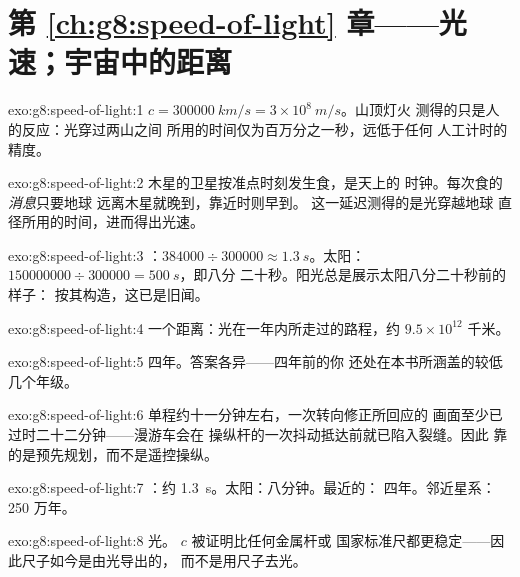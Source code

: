 \section*{第 \ref{ch:g8:speed-of-light} 章——光速；宇宙中的距离}

\begin{solution}{exo:g8:speed-of-light:1}
$c = \qty{300000}{km/s} = 3 \times 10^{8}\ \unit{m/s}$。山顶灯火
测得的只是人的反应：光穿过两山之间
所用的时间仅为百万分之一秒，远低于任何
人工计时的精度。
\end{solution}

\begin{solution}{exo:g8:speed-of-light:2}
木星的卫星按准点时刻发生食，是天上的
时钟。每次食的\emph{消息}只要地球
远离木星就晚到，靠近时则早到。
这一延迟测得的是光穿越地球
直径所用的时间，进而得出光速。
\end{solution}

\begin{solution}{exo:g8:speed-of-light:3}
：$384000 \div 300000 \approx \qty{1.3}{s}$。太阳：
$150000000 \div 300000 = \qty{500}{s}$，即八分
二十秒。阳光总是展示太阳八分二十秒前的样子：
按其构造，这已是旧闻。
\end{solution}

\begin{solution}{exo:g8:speed-of-light:4}
一个距离：光在一年内所走过的路程，约
$9.5 \times 10^{12}$ 千米。
\end{solution}

\begin{solution}{exo:g8:speed-of-light:5}
四年。答案各异——四年前的你
还处在本书所涵盖的较低几个年级。
\end{solution}

\begin{solution}{exo:g8:speed-of-light:6}
单程约十一分钟左右，一次转向修正所回应的
画面至少已过时二十二分钟——漫游车会在
操纵杆的一次抖动抵达前就已陷入裂缝。因此
靠的是预先规划，而不是遥控操纵。
\end{solution}

\begin{solution}{exo:g8:speed-of-light:7}
：约 \qty{1.3}{s}。太阳：八分钟。最近的：
四年。邻近星系：250 万年。
\end{solution}

\begin{solution}{exo:g8:speed-of-light:8}
光。 $c$ 被证明比任何金属杆或
国家标准尺都更稳定——因此尺子如今是由光导出的，
而不是用尺子去光。
\end{solution}


